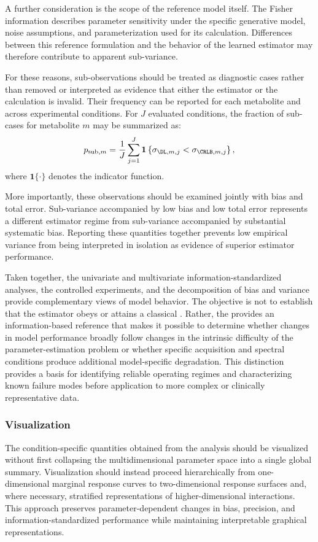 A further consideration is the scope of the reference model itself. The Fisher information describes parameter sensitivity under the specific generative model, noise assumptions, and parameterization used for its calculation. Differences between this reference formulation and the behavior of the learned estimator may therefore contribute to apparent sub-\CRLB variance.

For these reasons, sub-\CRLB observations should be treated as diagnostic cases rather than removed or interpreted as evidence that either the \DL estimator or the \CRLB calculation is invalid. Their frequency can be reported for each metabolite and across experimental conditions. For $J$ evaluated conditions, the fraction of sub-\CRLB cases for metabolite $m$ may be summarized as:
\begin{equation}
    p_{\mathrm{sub},m} = \frac{1}{J}\sum_{j=1}^{J}\mathbf{1}\left\{\sigma_{\DL,m,j} < \sigma_{\CRLB,m,j} \right\},
\end{equation}
where $\mathbf{1}\{\cdot\}$ denotes the indicator function.

More importantly, these observations should be examined jointly with bias and total error. Sub-\CRLB variance accompanied by low bias and low total error represents a different estimator regime from sub-\CRLB variance accompanied by substantial systematic bias. Reporting these quantities together prevents low empirical variance from being interpreted in isolation as evidence of superior estimator performance.

Taken together, the univariate and multivariate information-standardized analyses, the controlled \MC experiments, and the decomposition of bias and variance provide complementary views of model behavior. The objective is not to establish that the \DL estimator obeys or attains a classical \CRLB. Rather, the \CRLB provides an information-based reference that makes it possible to determine whether changes in model performance broadly follow changes in the intrinsic difficulty of the parameter-estimation problem or whether specific acquisition and spectral conditions produce additional model-specific degradation. This distinction provides a basis for identifying reliable operating regimes and characterizing known failure modes before application to more complex or clinically representative data.

\subsubsection{Visualization}
\label{sec:Analy&Visual:subsec:infoStand:subsubsec:visualization}
The condition-specific quantities obtained from the \MC analysis should be visualized without first collapsing the multidimensional parameter space into a single global summary. Visualization should instead proceed hierarchically from one-dimensional marginal response curves to two-dimensional response surfaces and, where necessary, stratified representations of higher-dimensional interactions. This approach preserves parameter-dependent changes in bias, precision, and information-standardized performance while maintaining interpretable graphical representations.

